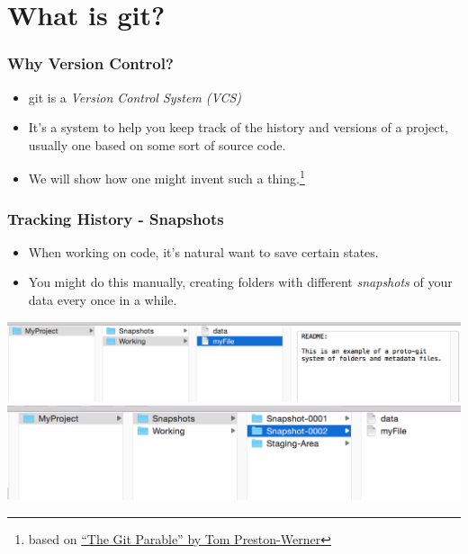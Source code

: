 \documentclass{beamer}
\begin{document}
\section{What is git?}
\begin{frame}[fragile]
\frametitle{Why Version Control?}
\begin{itemize}
\item
git is a \emph{Version Control System (VCS)}
\item It's a system to help you keep track of the history and versions of a project, usually one based on some sort of source code.
\item 
We will show how one might invent such a thing.\footnote{based on \href{http://tom.preston-werner.com/2009/05/19/the-git-parable.html}{``The Git Parable'' by Tom Preston-Werner}}
\end{itemize}
\end{frame}

\begin{frame}[fragile]
\frametitle{Tracking History - Snapshots}
\begin{itemize}
\item When working on code, it's natural want to save certain states.
\item You might do this manually, creating folders with different \emph{snapshots} of your data every once in a while.
\end{itemize}
\includegraphics[scale=0.4]{snapshot1.png}\\
\vspace{10px}
\includegraphics[scale=0.4]{snapshot2.png}

\end{frame}
\end{document}

